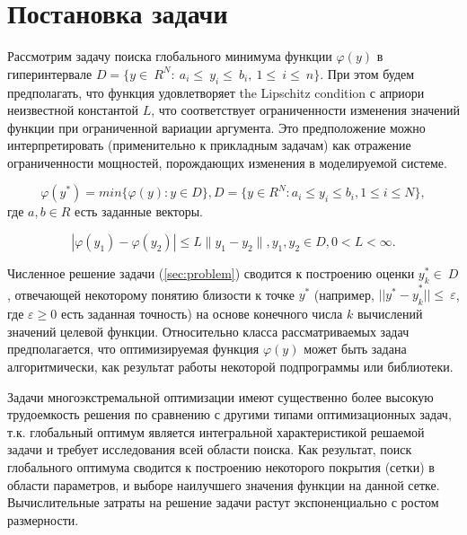 \documentclass{svproc}
\begin{document}

\section{Постановка задачи}

Рассмотрим задачу поиска глобального минимума функции $\varphi(y)$ в гиперинтервале $D=\{ y\in\ R^N:\ a_i\le\ y_i\le\ b_i,\ 1\le\ i\le\ n \}$. При этом будем предполагать, что функция удовлетворяет the Lipschitz condition с априори неизвестной константой $L$, что соответствует ограниченности изменения значений функции при ограниченной вариации аргумента. Это предположение можно интерпретировать (применительно к прикладным задачам) как отражение ограниченности мощностей, порождающих изменения в моделируемой системе. 




\begin{equation} \label{sec:problem}   
\varphi(y^*) = min\{\varphi(y):y\in D\}, D = \{y \in R^N : a_i \leq y_i \leq b_i, 1 \leq i \leq N \},
\end{equation}
где $a,b \in R$ есть заданные векторы.


\begin{displaymath}
|\varphi(y_1)-\varphi(y_2)|\leq L\parallel y_1-y_2 \parallel
,y_1,y_2 \in D, 0<L< \infty.
\end{displaymath}




Численное решение задачи (\ref{sec:problem})   сводится к построению оценки $ y_k^\ast\in\ D$ , отвечающей некоторому понятию близости к точке $y^\ast$ (например, ${||y^\ast-y}_k^\ast||\le\ \varepsilon$, где $\varepsilon\geq0$ есть заданная точность) на основе конечного числа $k$ вычислений значений целевой функции. Относительно класса рассматриваемых задач предполагается, что оптимизируемая функция $\varphi(y)$ может быть задана алгоритмически, как результат работы некоторой подпрограммы или библиотеки.

Задачи многоэкстремальной оптимизации имеют существенно более высокую трудоемкость решения по сравнению с другими типами оптимизационных задач, т.к. глобальный оптимум является интегральной характеристикой решаемой задачи и требует исследования всей области поиска. Как результат, поиск глобального оптимума сводится к построению некоторого покрытия (сетки) в области параметров, и выборе наилучшего значения функции на данной сетке. Вычислительные затраты на решение задачи растут экспоненциально с ростом размерности.
\end{document}
